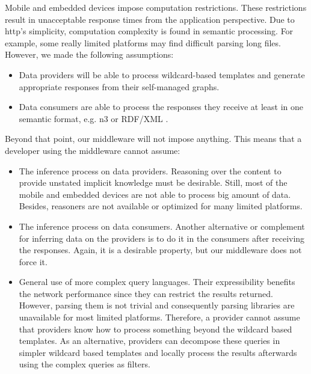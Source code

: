Mobile and embedded devices impose computation restrictions.
These restrictions result in unacceptable response times from the application perspective.
Due to \ac{http}'s simplicity, computation complexity is found in semantic processing.
For example, some really limited platforms may find difficult parsing long files.
However, we made the following assumptions:
\begin{itemize}
  \item Data providers will be able to process wildcard-based templates and generate appropriate responses from their self-managed graphs.
  \item Data consumers are able to process the responses they receive at least in one semantic format, e.g. \acs{n3}  or RDF/XML . %
\end{itemize}


Beyond that point, our middleware will not impose anything.
This means that a developer using the middleware cannot assume:
\begin{itemize}
  \item The inference process on data providers.
        Reasoning over the content to provide unstated implicit knowledge must be desirable.
        Still, most of the mobile and embedded devices are not able to process big amount of data. %
        Besides, reasoners are not available or optimized for many limited platforms.
  \item The inference process on data consumers.
        Another alternative or complement for inferring data on the providers is to do it in the consumers after receiving the responses.
        Again, it is a desirable property, but our middleware does not force it.
  \item General use of more complex query languages.
        Their expressibility benefits the network performance since they can restrict the results returned.
        However, parsing them is not trivial and consequently parsing libraries are unavailable for most limited platforms.
        Therefore, a provider cannot assume that providers know how to process something beyond the wildcard based templates.
        As an alternative, providers can decompose these queries in simpler wildcard based templates and locally process the results afterwards using the complex queries as filters.
\end{itemize}


